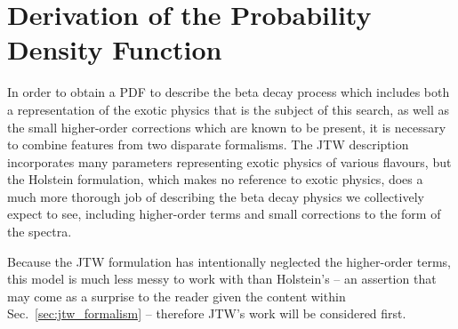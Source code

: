 %
%
%
\chapter[Derivation of the Beta Decay Probability Density Function]{Derivation of the Probability Density Function}
\label{appendix_forthepeople}
In order to obtain a \acf{PDF} to describe the beta decay process which includes both a representation of the exotic physics that is the subject of this search, as well as the small higher-order corrections which are known to be present, it is necessary to combine features from two disparate formalisms.  The \acf{JTW} description incorporates many parameters representing exotic physics of various flavours, but the Holstein formulation, which makes no reference to exotic physics, does a much more thorough job of describing the beta decay physics we collectively expect to see, including higher-order terms and small corrections to the form of the spectra.


Because the \ac{JTW} formulation has intentionally neglected the higher-order terms, this model is much less messy to work with than Holstein's -- an assertion that may come as a surprise to the reader given the content within Sec.~\ref{sec:jtw_formalism} -- therefore \ac{JTW}'s work will be considered first.  



